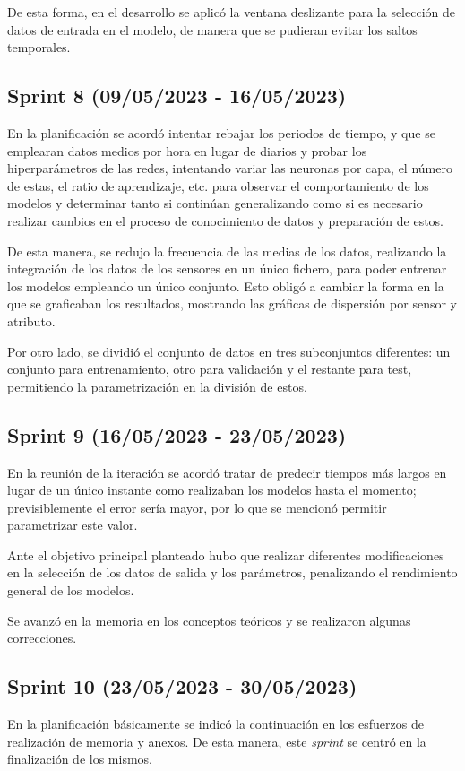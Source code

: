 De esta forma, en el desarrollo se aplicó la ventana deslizante para la selección de datos de entrada en el modelo, de manera que se pudieran evitar los saltos
temporales.

\subsection{Sprint 8 (09/05/2023 - 16/05/2023)}
En la planificación se acordó intentar rebajar los periodos de tiempo, y que se emplearan datos medios por hora en lugar de diarios y probar los hiperparámetros
de las redes, intentando variar las neuronas por capa, el número de estas, el ratio de aprendizaje, etc. para observar el comportamiento de los modelos y
determinar tanto si continúan generalizando como si es necesario realizar cambios en el proceso de conocimiento de datos y preparación de estos.

De esta manera, se redujo la frecuencia de las medias de los datos, realizando la integración de los datos de los sensores en un único fichero, para poder
entrenar los modelos empleando un único conjunto. Esto obligó a cambiar la forma en la que se graficaban los resultados, mostrando las gráficas de 
dispersión por sensor y atributo.

Por otro lado, se dividió el conjunto de datos en tres subconjuntos diferentes: un conjunto para entrenamiento, otro para validación y el restante para test, 
permitiendo la parametrización en la división de estos.

\subsection{Sprint 9 (16/05/2023 - 23/05/2023)}
En la reunión de la iteración se acordó tratar de predecir tiempos más largos en lugar de un único instante como realizaban los modelos hasta el momento;
previsiblemente el error sería mayor, por lo que se mencionó permitir parametrizar este valor.

Ante el objetivo principal planteado hubo que realizar diferentes modificaciones en la selección de los datos de salida y los parámetros, penalizando el rendimiento
general de los modelos.

Se avanzó en la memoria en los conceptos teóricos y se realizaron algunas correcciones.

\subsection{Sprint 10 (23/05/2023 - 30/05/2023)}
En la planificación básicamente se indicó la continuación en los esfuerzos de realización de memoria y anexos.
De esta manera, este \textit{sprint} se centró en la finalización de los mismos.


